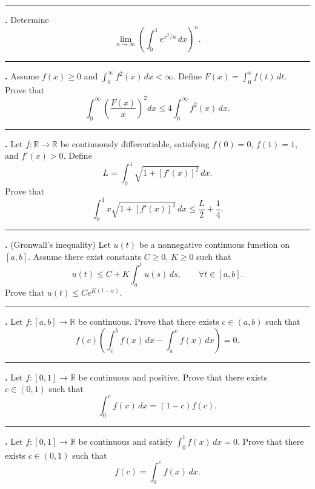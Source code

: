 \documentclass[11pt]{article}
\newcounter{probnum}
\newenvironment{problembox}{\par\noindent\rule{\linewidth}{0.5pt}\vspace{5pt}\par}{\vspace{2pt}}
\begin{document}
\begin{problembox}
\textbf{\theprobnum.} Determine
\[
\lim_{n \to \infty} \left(\int_0^1 e^{x^2/n}\,dx\right)^n.
\]
\end{problembox}

\begin{problembox}
\textbf{\theprobnum.} Assume $f(x) \ge 0$ and $\displaystyle\int_0^{\infty} f^2(x)\,dx < \infty$. Define $F(x) = \displaystyle\int_0^x f(t)\,dt$. Prove that
\[
\int_0^{\infty} \left(\frac{F(x)}{x}\right)^2 dx \le 4 \int_0^{\infty} f^2(x)\,dx.
\]
\end{problembox}

\begin{problembox}
\textbf{\theprobnum.} Let $f : \mathbb{R} \to \mathbb{R}$ be continuously differentiable, satisfying $f(0)=0$, $f(1)=1$, and $f'(x) > 0$. Define
\[
L = \int_0^1 \sqrt{1+[f'(x)]^2}\,dx.
\]
Prove that
\[
\int_0^1 x \sqrt{1+[f'(x)]^2}\,dx \le \frac{L}{2} + \frac{1}{4}.
\]
\end{problembox}

\begin{problembox}
\textbf{\theprobnum.} (Gronwall's inequality) Let $u(t)$ be a nonnegative continuous function on $[a,b]$. Assume there exist constants $C \ge 0$, $K \ge 0$ such that
\[
u(t) \le C + K \int_a^t u(s)\,ds, \qquad \forall t \in [a,b].
\]
Prove that $u(t) \le C e^{K(t-a)}$.
\end{problembox}

\begin{problembox}
\textbf{\theprobnum.} Let $f : [a,b] \to \mathbb{R}$ be continuous. Prove that there exists $c \in (a,b)$ such that
\[
f(c) \left(\int_c^b f(x)\,dx - \int_a^c f(x)\,dx\right) = 0.
\]
\end{problembox}

\begin{problembox}
\textbf{\theprobnum.} Let $f : [0,1] \to \mathbb{R}$ be continuous and positive. Prove that there exists $c \in (0,1)$ such that
\[
\int_0^c f(x)\,dx = (1-c) f(c).
\]
\end{problembox}

\begin{problembox}
\textbf{\theprobnum.} Let $f : [0,1] \to \mathbb{R}$ be continuous and satisfy $\displaystyle\int_0^1 f(x)\,dx = 0$. Prove that there exists $c \in (0,1)$ such that
\[
f(c) = \int_0^c f(x)\,dx.
\]
\end{problembox}
\end{document}

